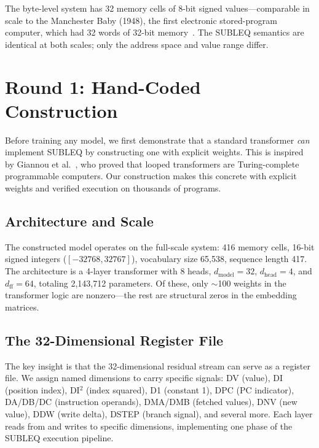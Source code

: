 \documentclass[11pt,a4paper]{article}
\begin{document}
The byte-level system has 32 memory cells of 8-bit signed values---comparable in scale to the Manchester Baby (1948), the first electronic stored-program computer, which had 32 words of 32-bit memory~\cite{manchesterbaby}.
The SUBLEQ semantics are identical at both scales; only the address space and value range differ.

\section{Round 1: Hand-Coded Construction}
\label{sec:round1}

Before training any model, we first demonstrate that a standard transformer \emph{can} implement SUBLEQ by constructing one with explicit weights.
This is inspired by Giannou et al.~\cite{giannou2023looped}, who proved that looped transformers are Turing-complete programmable computers.
Our construction makes this concrete with explicit weights and verified execution on thousands of programs.

\subsection{Architecture and Scale}

The constructed model operates on the full-scale system: 416 memory cells, 16-bit signed integers ($[-32768, 32767]$), vocabulary size 65{,}538, sequence length 417.
The architecture is a 4-layer transformer with 8 heads, $d_\text{model} = 32$, $d_\text{head} = 4$, and $d_\text{ff} = 64$, totaling 2{,}143{,}712 parameters.
Of these, only $\sim$100 weights in the transformer logic are nonzero---the rest are structural zeros in the embedding matrices.

\subsection{The 32-Dimensional Register File}

The key insight is that the 32-dimensional residual stream can serve as a register file.
We assign named dimensions to carry specific signals: DV (value), DI (position index), DI$^2$ (index squared), D1 (constant 1), DPC (PC indicator), DA/DB/DC (instruction operands), DMA/DMB (fetched values), DNV (new value), DDW (write delta), DSTEP (branch signal), and several more.
Each layer reads from and writes to specific dimensions, implementing one phase of the SUBLEQ execution pipeline.
\end{document}
